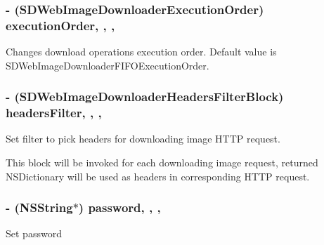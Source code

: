 \subsubsection[{execution\+Order}]{\setlength{\rightskip}{0pt plus 5cm}-\/ (S\+D\+Web\+Image\+Downloader\+Execution\+Order) execution\+Order\hspace{0.3cm}{\ttfamily [read]}, {\ttfamily [write]}, {\ttfamily [nonatomic]}, {\ttfamily [assign]}}\label{interface_s_d_web_image_downloader_a4f5cbec407970585eb0c08de1a0319fa}
Changes download operations execution order. Default value is {\ttfamily S\+D\+Web\+Image\+Downloader\+F\+I\+F\+O\+Execution\+Order}. \hypertarget{interface_s_d_web_image_downloader_ae7594a7c9a621aaa6a27fdb72fcbae9b}{}
\subsubsection[{headers\+Filter}]{\setlength{\rightskip}{0pt plus 5cm}-\/ (S\+D\+Web\+Image\+Downloader\+Headers\+Filter\+Block) headers\+Filter\hspace{0.3cm}{\ttfamily [read]}, {\ttfamily [write]}, {\ttfamily [nonatomic]}, {\ttfamily [copy]}}\label{interface_s_d_web_image_downloader_ae7594a7c9a621aaa6a27fdb72fcbae9b}
Set filter to pick headers for downloading image H\+T\+T\+P request.

This block will be invoked for each downloading image request, returned N\+S\+Dictionary will be used as headers in corresponding H\+T\+T\+P request. \hypertarget{interface_s_d_web_image_downloader_a12a536dd22cd02d2a6ef3588cc0a37d9}{}
\subsubsection[{password}]{\setlength{\rightskip}{0pt plus 5cm}-\/ (N\+S\+String$\ast$) password\hspace{0.3cm}{\ttfamily [read]}, {\ttfamily [write]}, {\ttfamily [nonatomic]}, {\ttfamily [strong]}}\label{interface_s_d_web_image_downloader_a12a536dd22cd02d2a6ef3588cc0a37d9}
Set password \hypertarget{interface_s_d_web_image_downloader_ac91a3f91279023164c48bd066abbfbea}{}

